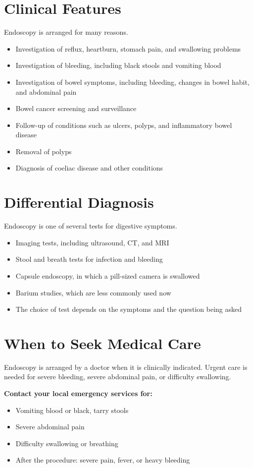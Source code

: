 \section*{Clinical Features}
Endoscopy is arranged for many reasons.
\begin{itemize}
    \item Investigation of reflux, heartburn, stomach pain, and swallowing problems
    \item Investigation of bleeding, including black stools and vomiting blood
    \item Investigation of bowel symptoms, including bleeding, changes in bowel habit, and abdominal pain
    \item Bowel cancer screening and surveillance
    \item Follow-up of conditions such as ulcers, polyps, and inflammatory bowel disease
    \item Removal of polyps
    \item Diagnosis of coeliac disease and other conditions
\end{itemize}

\section*{Differential Diagnosis}
Endoscopy is one of several tests for digestive symptoms.
\begin{itemize}
    \item Imaging tests, including ultrasound, CT, and MRI
    \item Stool and breath tests for infection and bleeding
    \item Capsule endoscopy, in which a pill-sized camera is swallowed
    \item Barium studies, which are less commonly used now
    \item The choice of test depends on the symptoms and the question being asked
\end{itemize}

\section*{When to Seek Medical Care}
Endoscopy is arranged by a doctor when it is clinically indicated. Urgent care is needed for severe bleeding, severe abdominal pain, or difficulty swallowing.

\textbf{Contact your local emergency services for:}
\begin{itemize}
    \item Vomiting blood or black, tarry stools
    \item Severe abdominal pain
    \item Difficulty swallowing or breathing
    \item After the procedure: severe pain, fever, or heavy bleeding
\end{itemize}


